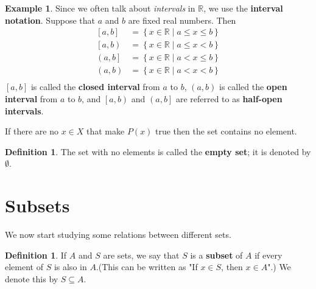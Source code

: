 \documentclass[a4paper, 11pt]{report}
\theoremstyle{plain}
\theoremstyle{definition}
\newtheorem{defn}[thm]{Definition}
\newtheorem{exmp}[thm]{Example}
\begin{document}

\begin{exmp}
  Since we often talk about \textit{intervals} in $\mathbb{R}$, we use the \textbf{interval notation}. Suppose that $a$ and $b$ are fixed real numbers. Then
  \begin{align*}
    \left[ a, b \right] &= \left\{ x \in \mathbb{R} \mid a \leq x \leq b \right\} \\
    \left[ a, b \right) &= \left\{ x \in \mathbb{R} \mid a \leq x < b \right\} \\
    \left( a, b \right] &= \left\{ x \in \mathbb{R} \mid a < x \leq b \right\} \\
    \left( a, b \right) &= \left\{ x \in \mathbb{R} \mid a < x < b \right\} \\
  \end{align*}
  $ \left[ a, b \right]$ is called the \textbf{closed interval} from $a$ to $b$, $\left( a, b \right)$ is called the \textbf{open
  interval} from $a$ to $b$, and $\left[ a, b \right)$ and
  $\left( a, b\right]$ are referred to as \textbf{half-open intervals}.
\end{exmp}

If there are no $x \in X$ that make $P(x)$ true then the set contains no element.
\begin{defn}
  The set with no elements is called the \textbf{empty set};
  it is denoted by $\emptyset$\index{$\emptyset$}.
\end{defn}

\section{Subsets}
\label{sec:subsets}

We now start studying some relations between different sets.
\begin{defn}
  If $A$ and $S$ are sets, we say that $S$ is a \textbf{subset}
  of $A$ if every element of $S$ is also in $A$.(This can be written as "If $x
  \in S$, then $x \in A$".) We denote this by $S \subseteq
  A$\index{$\subseteq$}.
\end{defn}
\end{document}
